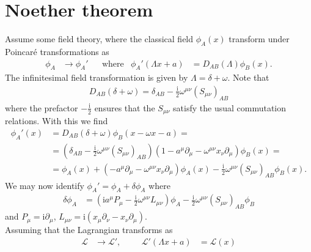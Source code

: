 \documentclass[english, parskip=full]{scrartcl}
\title{\titel}
\author{\autor}
\date{\today}
\newcommand{\kla}{}
\newcommand{\tecxt}{}
\renewcommand{\i}{\text{i}}
\begin{document}
\maketitle  %

\section{Noether theorem}
Assume some field theory, where the classical field $\phi_A(x)$ transform under Poincar\'e transformations as
\begin{align}
\phi_A &\rightarrow \phi_A' && \tecxt\text{where} & \phi_A'(\Lambda x + a) &= D_{AB}(\Lambda) \phi_B(x).
\end{align}
The infinitesimal field transformation is given by $\Lambda = \delta + \omega$.
Note that 
\begin{align}
D_{AB}(\delta + \omega) = \delta_{AB} - \frac{\i}{2}\omega^{\mu\nu} (S_{\mu\nu})_{AB}
\end{align} 
where the prefactor $-\frac{\i}{2}$ ensures that the $S_{\mu\nu}$ satisfy the usual commutation relations.
With this we find
\begin{align}
\phi_A'(x) &= D_{AB}(\delta + \omega) \phi_B (x - \omega x - a) = \\
&= \kla\left( \delta_{AB} - \frac{\i}{2} \omega^{\mu\nu} (S_{\mu\nu})_{AB} \right) \left( 1 - a^\mu \partial_\mu - \omega^{\mu\nu} x_\nu \partial_\mu  \right) \phi_B(x) = \\
&= \phi_A(x) + \left( - a^\mu \partial_\mu - \omega^{\mu\nu} x_\nu \partial_\mu \right) \phi_A(x) - \frac{\i}{2} \omega^{\mu\nu} (S_{\mu\nu})_{AB} \phi_B(x).
\end{align}
We may now identify $\phi_A' = \phi_A + \delta \phi_A$ where
\begin{align}
\delta\phi_A &= \left( \i a^\mu P_\mu - \frac{\i}{2} \omega^{\mu\nu} L_{\mu\nu} \right) \phi_A - \frac{\i}{2} \omega^{\mu\nu} (S_{\mu\nu})_{AB} \phi_B
\end{align}
and $P_\mu = \i\partial_\mu$, $L_{\mu\nu} = \i \left( x_{\mu} \partial_\nu - x_\nu \partial_\mu  \right)$.\\
Assuming that the Lagrangian transforms as 
\begin{align}
\mathcal{L} &\rightarrow \mathcal{L}', &&& \mathcal{L}'(\Lambda x + a) &= \mathcal{L}(x)
\end{align}
\end{document}
